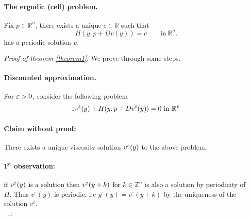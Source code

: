 \documentclass[12pt, oneside]{amsart}  	%
\newcommand\Z{\mathbb{Z}} \newcommand\N{\mathbb{N}} \newcommand\C{\mathbb{C}}
\begin{document}
\paragraph{\textbf{The ergodic (cell) problem.}} Fix $p\in\mathbb{R}^n$, there exists a unique $c\in \mathbb{R}$ such that
\begin{equation}\label{Ergodic_cell_problem}
H(y,p+Dv(y)) = c \qquad\text{in}\;\mathbb{R}^n \tag{$E_p$}.
\end{equation}
has a periodic solution $v$.
\begin{proof}[Proof of theorem \ref{theorem1}] We prove through some steps.\\


\paragraph{\textbf{Discounted approximation.}} For $\varepsilon>0$, consider the following problem
\begin{equation*}
\varepsilon v^\varepsilon(y) + H(y, p+Dv^\varepsilon(y))=0 \text{ in } \mathbb{R}^n
\end{equation*}


\paragraph{\textbf{Claim without proof:}} There exists a unique viscosity solution $v^\varepsilon(y)$ to the above problem.\\



\paragraph{\textbf{$1^{\text{st}}$ observation:}} if $v^\varepsilon(y)$ is a solution then $v^\varepsilon(y+k)$ for $k\in \Z^n$ is also a solution by periodicity of $H$. Thus $v^\varepsilon(y)$ is periodic, i.e $y^\varepsilon(y) = v^\varepsilon(y+k)$ by the uniqueness of the solution $v^\varepsilon$.\\




\end{proof}
\end{document}
